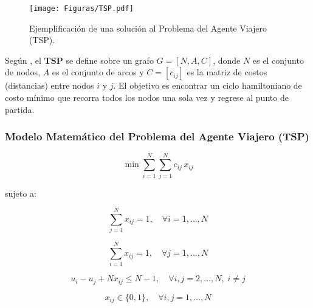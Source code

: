 \documentclass[12pt,titlepage,twoside,openright]{book}
\begin{document}
\begin{figure}[H]
	\centering
	\texttt{[image: Figuras/TSP.pdf]}
	\caption{Ejemplificación de una solución al Problema del Agente Viajero (TSP).}
	\label{fig:tsp}
\end{figure}



Según \citep{torres2018}, el \textbf{TSP} se define sobre un grafo \(G = [N,A,C]\), donde \(N\) es el conjunto de nodos, \(A\) es el conjunto de arcos y \(C = [c_{ij}]\) es la matriz de costos (distancias) entre nodos \(i\) y \(j\). El objetivo es encontrar un ciclo hamiltoniano de costo mínimo que recorra todos los nodos una sola vez y regrese al punto de partida.

\subsubsection*{Modelo Matemático del Problema del Agente Viajero (TSP)}

\begin{equation}
	\min \sum_{i=1}^N \sum_{j=1}^N c_{ij}\,x_{ij}
	\label{eq:TSP_obj}
\end{equation}

sujeto a:

\begin{equation}
	\sum_{j=1}^N x_{ij} = 1, \quad \forall i = 1,\dots,N
	\label{eq:TSP_out}
\end{equation}

\begin{equation}
	\sum_{i=1}^N x_{ij} = 1, \quad \forall j = 1,\dots,N
	\label{eq:TSP_in}
\end{equation}

\begin{equation}
	u_i - u_j + N x_{ij} \leq N - 1, \quad \forall i,j = 2,\dots,N, \; i \neq j
	\label{eq:TSP_subtour}
\end{equation}

\begin{equation}
	x_{ij} \in \{0,1\}, \quad \forall i,j = 1,\dots,N
	\label{eq:TSP_bin}
\end{equation}
\end{document}
